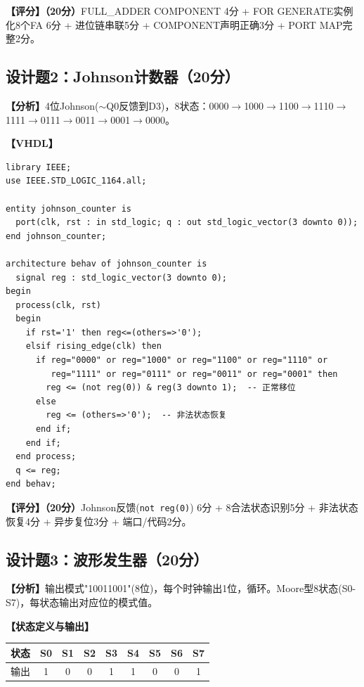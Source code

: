 \textbf{【评分】（20分）}FULL\_ADDER COMPONENT 4分 + FOR GENERATE实例化8个FA 6分 + 进位链串联5分 + COMPONENT声明正确3分 + PORT MAP完整2分。

\subsection{设计题2：Johnson计数器（20分）}

\textbf{【分析】}4位Johnson($\sim$Q0反馈到D3)，8状态：0000$\to$1000$\to$1100$\to$1110$\to$1111$\to$0111$\to$0011$\to$0001$\to$0000。

\textbf{【VHDL】}
\begin{lstlisting}
library IEEE;
use IEEE.STD_LOGIC_1164.all;

entity johnson_counter is
  port(clk, rst : in std_logic; q : out std_logic_vector(3 downto 0));
end johnson_counter;

architecture behav of johnson_counter is
  signal reg : std_logic_vector(3 downto 0);
begin
  process(clk, rst)
  begin
    if rst='1' then reg<=(others=>'0');
    elsif rising_edge(clk) then
      if reg="0000" or reg="1000" or reg="1100" or reg="1110" or
         reg="1111" or reg="0111" or reg="0011" or reg="0001" then
        reg <= (not reg(0)) & reg(3 downto 1);  -- 正常移位
      else
        reg <= (others=>'0');  -- 非法状态恢复
      end if;
    end if;
  end process;
  q <= reg;
end behav;
\end{lstlisting}

\textbf{【评分】（20分）}Johnson反馈(\texttt{not reg(0)}) 6分 + 8合法状态识别5分 + 非法状态恢复4分 + 异步复位3分 + 端口/代码2分。

\subsection{设计题3：波形发生器（20分）}

\textbf{【分析】}输出模式"10011001"(8位)，每个时钟输出1位，循环。Moore型8状态(S0-S7)，每状态输出对应位的模式值。

\textbf{【状态定义与输出】}
\begin{center}
\begin{tabular}{|c|c|c|c|c|c|c|c|c|}
\hline 状态 & S0 & S1 & S2 & S3 & S4 & S5 & S6 & S7 \\
\hline 输出 & 1 & 0 & 0 & 1 & 1 & 0 & 0 & 1 \\
\hline
\end{tabular}
\end{center}


